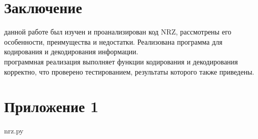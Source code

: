 \documentclass[a4paper14pt]{article}
\begin{document}
\section{Заключение}
 данной работе был изучен и проанализирован код NRZ, рассмотрены его особенности, преимущества и недостатки. Реализована программа для кодирования и декодирования информации.\\

 программная реализация выполняет функции кодирования и декодирования корректно, что проверено тестированием, результаты которого также приведены.\\

\newpage
\section*{Приложение 1}
 nrz.py
\lstset{language=Python}
\end{document}
